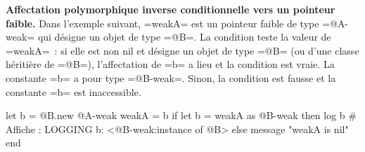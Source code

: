 {\bf Affectation polymorphique inverse conditionnelle vers un pointeur faible.} Dans l'exemple suivant, \ggs=weakA= est un pointeur faible de type \ggs=@A-weak= qui désigne un objet de type \ggs=@B=. La condition teste la valeur de \ggs=weakA=~: si elle est non nil et désigne un objet de type \ggs=@B= (ou d'une classe héritière de \ggs=@B=), l'affectation de \ggs=b= a lieu et la condition est vraie. La constante \ggs=b= a pour type \ggs=@B-weak=. Sinon, la condition est fausse et la constante \ggs=b= est inaccessible.

\begin{galgas}
  let b = @B.new
  @A-weak weakA = b
  if let b = weakA as @B-weak then
    log b # Affiche : LOGGING b: <@B-weak:instance of @B>
  else
    message "weakA is nil\n"
  end
\end{galgas}


